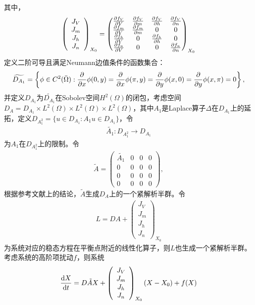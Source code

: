 \documentclass[
pdflinks,
]{xjtuthesis}
\begin{document}
其中，
\begin{align}
\left(
\begin{array}{c}
J_V\\
J_m\\
J_h\\
J_n
\end{array}
\right)_{X_0}=
\left(
\begin{matrix} 
\frac{\partial f_V}{\partial V} & \frac{\partial f_V}{\partial m} & \frac{\partial f_V}{\partial h} & \frac{\partial f_V}{\partial n}\\ 
\frac{\partial f_m}{\partial V} & \frac{\partial f_m}{\partial m} & 0 & 0\\ 
\frac{\partial f_h}{\partial V} & 0 & \frac{\partial f_h}{\partial h} & 0 \\
\frac{\partial f_n}{\partial V} & 0 & 0 & \frac{\partial f_n}{\partial n}
\end{matrix}
\right) _{X_0}
\end{align}
定义二阶可导且满足Neumann边值条件的函数集合：
\begin{align*}
\widetilde{D_{A_1}} = \left\{ \phi\in C^2(\bar{\Omega}):
\frac{\partial }{\partial x} \phi(0,y) = \frac{\partial }{\partial x} \phi(\pi,y) =
\frac{\partial }{\partial y} \phi(x,0) = \frac{\partial }{\partial y} \phi(x,\pi) = 0 \right\},
\end{align*}
并定义$D_{A_1}$为$\widetilde{D_{A_1}}$在Sobolev空间$H^2(\Omega)$的闭包，考虑空间$D_A=D_{A_1}\times L^2(\Omega) \times L^2(\Omega) \times L^2(\Omega)$，其中$A_1$是Laplace算子$\Delta$在$D_{A_1}$上的延拓，定义$D_{A_1^2}=\{u \in D_{A_1}:A _1 u\in D_{A_1}\}$，令
\begin{align*}
\tilde{A_1}:D_{A_1^2} \rightarrow D_{A_1}
\end{align*}
为$A_1$在$D_{A_1^2}$上的限制。令
\begin{align*}
\tilde{A}=\left(
\begin{array}{cccc}
\tilde{A_1} &0 & 0 &0\\
0&0 & 0 &0\\
0 &0 & 0 &0\\
0 &0 & 0 &0
\end{array}
\right),
\end{align*}
根据参考文献\cite{hassard1981theory}上的结论，$\tilde{A}$生成$D_A$上的一个紧解析半群。令
\begin{align*}
L=DA+\left(
\begin{array}{c}
J_V\\
J_m\\
J_h\\
J_n
\end{array}
\right)_{X_0}
\end{align*}
为系统对应的稳态方程在平衡点附近的线性化算子，则$L$也生成一个紧解析半群。考虑系统的高阶项扰动$f$，则系统
\begin{align}
\frac{\mathrm d X}{\mathrm d t}=D\tilde{A}X + \left(
\begin{array}{c}
J_V\\
J_m\\
J_h\\
J_n
\end{array}
\right)_{X_0} (X - X _0) +f(X)
\end{align}
\end{document}
